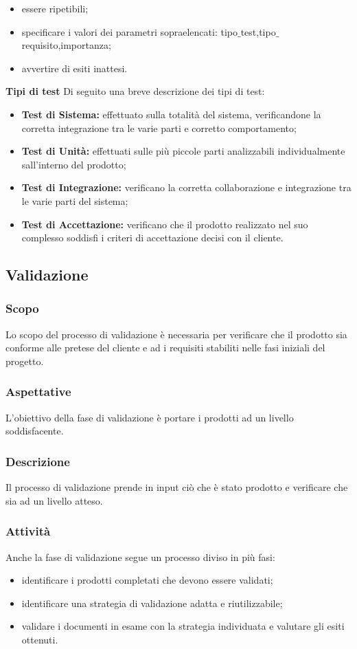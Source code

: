 \begin{itemize}
    \begin{itemize}
    	\item essere ripetibili;
    	\item specificare i valori dei parametri sopraelencati: tipo$\_$test,tipo$\_$requisito,importanza;
    	\item avvertire di esiti inattesi.
    \end{itemize}
	\textbf{Tipi di test}
	Di seguito una breve descrizione dei tipi di test:
	\begin{itemize}
		\item \textbf{Test di Sistema:} effettuato sulla totalità del sistema, verificandone la corretta integrazione tra le varie parti e corretto comportamento;
		\item \textbf{Test di Unità:} effettuati sulle più piccole parti analizzabili individualmente sall'interno del prodotto;
		\item \textbf{Test di Integrazione:} verificano la corretta collaborazione e integrazione tra le varie parti del sistema;
		\item \textbf{Test di Accettazione:} verificano che il prodotto realizzato nel suo complesso soddisfi i criteri di accettazione decisi con il cliente.
	\end{itemize}
  \end{itemize}
\subsection{Validazione} 
    \subsubsection{Scopo}
    Lo scopo del processo di validazione è necessaria per verificare che il prodotto sia conforme alle pretese del cliente e ad i requisiti stabiliti nelle fasi iniziali del progetto.
    \subsubsection{Aspettative}
    L'obiettivo della fase di validazione è portare i prodotti ad un livello soddisfacente.
    \subsubsection{Descrizione}
    Il processo di validazione prende in input ciò che è stato prodotto e verificare che sia ad un livello atteso.
    \subsubsection{Attività}
    Anche la fase di validazione segue un processo diviso in più fasi:
    \begin{itemize}
    	\item identificare i prodotti completati che devono essere validati;
    	\item identificare una strategia di validazione adatta e riutilizzabile;
    	\item validare i documenti in esame con la strategia individuata e valutare gli esiti ottenuti.
    \end{itemize}
    

